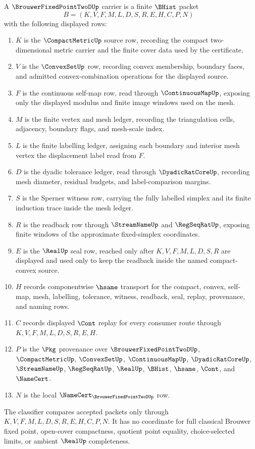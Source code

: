 \begin{definition}
\label{def:brouwer-fixed-point-2d-carrier}
A $\BrouwerFixedPointTwoDUp$ carrier is a finite $\BHist$ packet
$$
B=(K,V,F,M,L,D,S,R,E,H,C,P,N)
$$
with the following displayed rows:
\begin{enumerate}
\item $K$ is the $\CompactMetricUp$ source row, recording the compact two-dimensional metric carrier and the finite cover data used by the certificate.
\item $V$ is the $\ConvexSetUp$ row, recording convex membership, boundary faces, and admitted convex-combination operations for the displayed source.
\item $F$ is the continuous self-map row, read through $\ContinuousMapUp$, exposing only the displayed modulus and finite image windows used on the mesh.
\item $M$ is the finite vertex and mesh ledger, recording the triangulation cells, adjacency, boundary flags, and mesh-scale index.
\item $L$ is the finite labelling ledger, assigning each boundary and interior mesh vertex the displacement label read from $F$.
\item $D$ is the dyadic tolerance ledger, read through $\DyadicRatCoreUp$, recording mesh diameter, residual budgets, and label-comparison margins.
\item $S$ is the Sperner witness row, carrying the fully labelled simplex and its finite induction trace inside the mesh ledger.
\item $R$ is the readback row through $\StreamNameUp$ and $\RegSeqRatUp$, exposing finite windows of the approximate fixed-simplex coordinates.
\item $E$ is the $\RealUp$ seal row, reached only after $K,V,F,M,L,D,S,R$ are displayed and used only to keep the readback inside the named compact-convex source.
\item $H$ records componentwise $\hsame$ transport for the compact, convex, self-map, mesh, labelling, tolerance, witness, readback, seal, replay, provenance, and naming rows.
\item $C$ records displayed $\Cont$ replay for every consumer route through $K,V,F,M,L,D,S,R,E,H$.
\item $P$ is the $\Pkg$ provenance over $\BrouwerFixedPointTwoDUp$, $\CompactMetricUp$, $\ConvexSetUp$, $\ContinuousMapUp$, $\DyadicRatCoreUp$, $\StreamNameUp$, $\RegSeqRatUp$, $\RealUp$, $\BHist$, $\hsame$, $\Cont$, and $\NameCert$.
\item $N$ is the local $\NameCert_{\BrouwerFixedPointTwoDUp}$ row.
\end{enumerate}
The classifier compares accepted packets only through $K,V,F,M,L,D,S,R,E,H,C,P,N$. It has no coordinate for full classical Brouwer fixed point, open-cover compactness, quotient point equality, choice-selected limits, or ambient $\RealUp$ completeness.
\end{definition}

